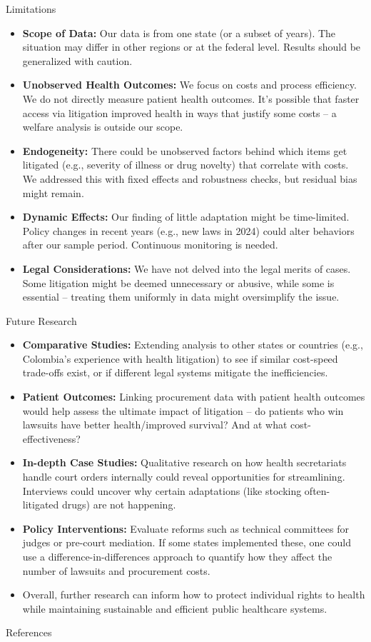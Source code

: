 \documentclass{beamer}
\begin{document}
\begin{frame}{Limitations}
\begin{itemize}
  \item \textbf{Scope of Data:} Our data is from one state (or a subset of years). The situation may differ in other regions or at the federal level. Results should be generalized with caution.
  \item \textbf{Unobserved Health Outcomes:} We focus on costs and process efficiency. We do not directly measure patient health outcomes. It’s possible that faster access via litigation improved health in ways that justify some costs – a welfare analysis is outside our scope.
  \item \textbf{Endogeneity:} There could be unobserved factors behind which items get litigated (e.g., severity of illness or drug novelty) that correlate with costs. We addressed this with fixed effects and robustness checks, but residual bias might remain.
  \item \textbf{Dynamic Effects:} Our finding of little adaptation might be time-limited. Policy changes in recent years (e.g., new laws in 2024) could alter behaviors after our sample period. Continuous monitoring is needed.
  \item \textbf{Legal Considerations:} We have not delved into the legal merits of cases. Some litigation might be deemed unnecessary or abusive, while some is essential – treating them uniformly in data might oversimplify the issue.
\end{itemize}
\end{frame}

\begin{frame}{Future Research}
\begin{itemize}
  \item \textbf{Comparative Studies:} Extending analysis to other states or countries (e.g., Colombia’s experience with health litigation) to see if similar cost-speed trade-offs exist, or if different legal systems mitigate the inefficiencies.
  \item \textbf{Patient Outcomes:} Linking procurement data with patient health outcomes would help assess the ultimate impact of litigation – do patients who win lawsuits have better health/improved survival? And at what cost-effectiveness?
  \item \textbf{In-depth Case Studies:} Qualitative research on how health secretariats handle court orders internally could reveal opportunities for streamlining. Interviews could uncover why certain adaptations (like stocking often-litigated drugs) are not happening.
  \item \textbf{Policy Interventions:} Evaluate reforms such as technical committees for judges or pre-court mediation. If some states implemented these, one could use a difference-in-differences approach to quantify how they affect the number of lawsuits and procurement costs.
  \item Overall, further research can inform how to protect individual rights to health while maintaining sustainable and efficient public healthcare systems.
\end{itemize}
\end{frame}

\begin{frame}[allowframebreaks]{References}
\nocite{*}

\end{frame}
\end{document}
